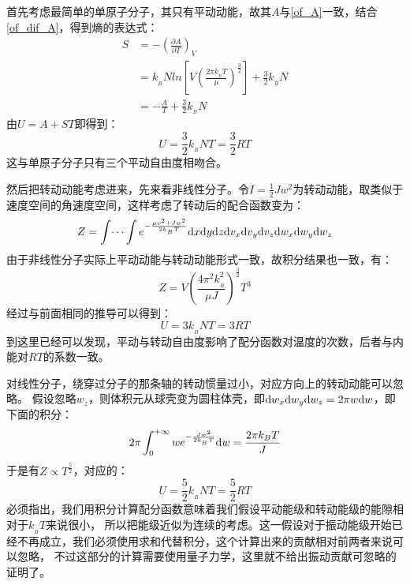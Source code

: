         \begin{prove}
            首先考虑最简单的单原子分子，其只有平动动能，故其$A$与\ref{of_A}一致，结合\ref{of_dif_A}，得到熵的表达式：
            \begin{equation}
                \begin{aligned}
                    S &= -\left(\frac{\partial A}{\partial T}\right)_{V} \\
                      &= k_{_B}Nln\left[V\left(\frac{2\pi k_{_B}T}{\mu}\right)^{\frac{3}{2}}\right]+\frac{3}{2}k_{_B}N\\
                      &= -\frac{A}{T} +\frac{3}{2}k_{_B}N
                \end{aligned}
            \end{equation}
            由$U=A+ST$即得到：
            \begin{equation}
                U = \frac{3}{2}k_{_B}NT = \frac{3}{2}RT
            \end{equation}
            这与单原子分子只有三个平动自由度相吻合。
            
            然后把转动动能考虑进来，先来看非线性分子。令$I=\frac{1}{2}Jw^{2}$为转动动能，取类似于速度空间的角速度空间，这样考虑了转动后的配合函数变为：
            \begin{equation}
                Z =\int \dots \int e^{-\frac{\mu v^{2}+J w^{2}}{2k_{_B}T}} \mathrm{d}{x}\mathrm{d}{y}\mathrm{d}{z}\mathrm{d}{v_x}\mathrm{d}{v_y}\mathrm{d}{v_z}\mathrm{d}{w_x}\mathrm{d}{w_y}\mathrm{d}{w_z}
            \end{equation}
            由于非线性分子实际上平动动能与转动动能形式一致，故积分结果也一致，有：
            \begin{equation}
                Z =  V\left(\frac{4\pi^{2} k_{_B}^{2}}{\mu J}\right)^{\frac{3}{2}} T^{3}
            \end{equation}
            经过与前面相同的推导可以得到：
            \begin{equation}
                U = 3k_{_B}NT = 3RT
            \end{equation}
            到这里已经可以发现，平动与转动自由度影响了配分函数对温度的次数，后者与内能对$RT$的系数一致。

            对线性分子，绕穿过分子的那条轴的转动惯量过小，对应方向上的转动动能可以忽略。
            假设忽略$w_z$，则体积元从球壳变为圆柱体壳，即$\mathrm{d}{w_x}\mathrm{d}{w_y}\mathrm{d}{w_z}=2\pi w\mathrm{d}{w}$，即下面的积分：
            \begin{equation}
                2\pi \int_{0}^{+\infty} we^{-\frac{J w^{2}}{2k_{_B}T}}\mathrm{d}{w} = \frac{2\pi k_{B}T}{J}
            \end{equation}
            于是有$Z\propto T^{\frac{5}{2}}$，对应的：
            \begin{equation}
                U = \frac{5}{2}k_{_B}NT = \frac{5}{2}RT
            \end{equation}
            必须指出，我们用积分计算配分函数意味着我们假设平动能级和转动能级的能隙相对于$k_{_B}T$来说很小，
            所以把能级近似为连续的考虑。这一假设对于振动能级开始已经不再成立，我们必须使用求和代替积分，这个计算出来的贡献相对前两者来说可以忽略，
            不过这部分的计算需要使用量子力学，这里就不给出振动贡献可忽略的证明了。
        \end{prove}
        
%
